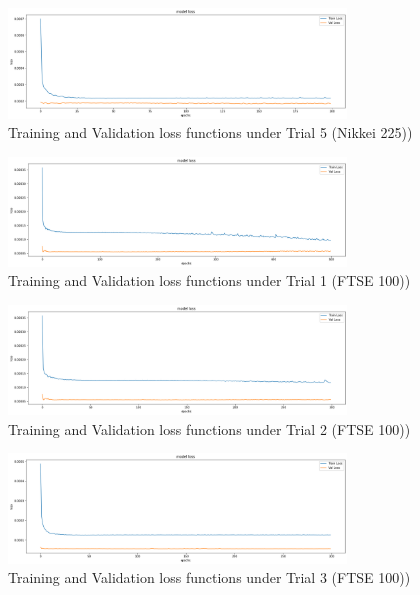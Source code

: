 \documentclass[a4paper,11pt,oneside]{book}
\begin{document}
\begin{appendix}
\begin{figure}[!h]
	\centering
	\includegraphics[width=0.8\textwidth]{figures/Nik5}
	\caption{Training and Validation loss functions under Trial 5 (Nikkei 225))}
	\label{Nik5}
\end{figure}

\begin{figure}[!h]
	\centering
	\includegraphics[width=0.8\textwidth]{figures/FTSE1}
	\caption{Training and Validation loss functions under Trial 1 (FTSE 100))}
	\label{FTSE1}
\end{figure}

\begin{figure}[!h]
	\centering
	\includegraphics[width=0.8\textwidth]{figures/FTSE2}
	\caption{Training and Validation loss functions under Trial 2 (FTSE 100))}
	\label{FTSE2}
\end{figure}	
	
\begin{figure}[!h]
	\centering
	\includegraphics[width=0.8\textwidth]{figures/FTSE3}
	\caption{Training and Validation loss functions under Trial 3 (FTSE 100))}
	\label{FTSE3}
\end{figure}	


\end{appendix}
\end{document}
